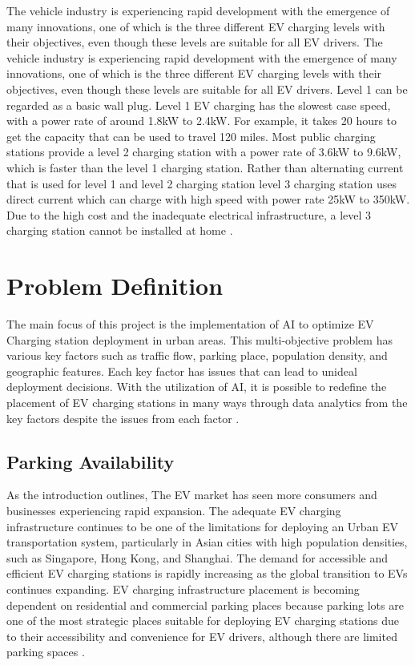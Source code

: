 The vehicle industry is experiencing rapid development with the emergence of many innovations, one of which is the three different EV charging levels with their objectives, even though these levels are suitable for all EV drivers. The vehicle industry is experiencing rapid development with the emergence of many innovations, one of which is the three different EV charging levels with their objectives, even though these levels are suitable for all EV drivers. Level 1 can be regarded as a basic wall plug. Level 1 EV charging has the slowest case speed, with a power rate of around 1.8kW to 2.4kW. For example, it takes 20 hours to get the capacity that can be used to travel 120 miles. Most public charging stations provide a level 2 charging station with a power rate of 3.6kW to 9.6kW, which is faster than the level 1 charging station. Rather than alternating current that is used for level 1 and level 2 charging station level 3 charging station uses direct current which can charge with high speed with power rate 25kW to 350kW. Due to the high cost and the inadequate electrical infrastructure, a level 3 charging station cannot be installed at home \cite{HowToGeekEVChargerLevels, EVChargingLevels}.

\section{Problem Definition}
The main focus of this project is the implementation of AI to optimize EV Charging station deployment in urban areas. This multi-objective problem has various key factors such as traffic flow, parking place, population density, and geographic features. Each key factor has issues that can lead to unideal deployment decisions. With the utilization of AI, it is possible to redefine the placement of EV charging stations in many ways through data analytics from the key factors despite the issues from each factor \cite{EVChargingSummit_AI}.
\subsection{Parking Availability}\label{sec:41}
As the introduction outlines, The EV market has seen more consumers and businesses experiencing rapid expansion. The adequate EV charging infrastructure continues to be one of the limitations for deploying an Urban EV transportation system, particularly in Asian cities with high population densities, such as Singapore, Hong Kong, and Shanghai.\cite{Wang2024} The demand for accessible and efficient EV charging stations is rapidly increasing as the global transition to EVs continues expanding. EV charging infrastructure placement is becoming dependent on residential and commercial parking places because parking lots are one of the most strategic places suitable for deploying EV charging stations due to their accessibility and convenience for EV drivers, although there are limited parking spaces  \cite{PilotEnergyStorage2024}.
